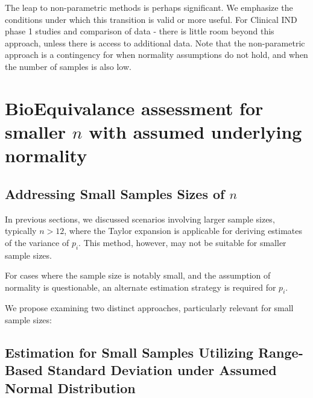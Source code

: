 \documentclass[
  12pt,
  a4paper,
]{article}
\numberwithin{equation}{section}
\theoremstyle{plain}
\theoremstyle{definition}
\theoremstyle{remark}
\theoremstyle{note}
\begin{document}
The leap to non-parametric methods is perhaps significant. We emphasize
the conditions under which this transition is valid or more useful. For
Clinical IND phase 1 studies and comparison of data - there is little
room beyond this approach, unless there is access to additional data.
Note that the non-parametric approach is a contingency for when
normality assumptions do not hold, and when the number of samples is
also low.

\newpage

\hypertarget{bioequivalance-assessment-for-smaller-n-with-assumed-underlying-normality}{%
\section{\texorpdfstring{BioEquivalance assessment for smaller \(n\)
with assumed underlying
normality}{BioEquivalance assessment for smaller n with assumed underlying normality}}\label{bioequivalance-assessment-for-smaller-n-with-assumed-underlying-normality}}

\hypertarget{addressing-small-samples-sizes-of-n}{%
\subsection{\texorpdfstring{Addressing Small Samples Sizes of
\(n\)}{Addressing Small Samples Sizes of n}}\label{addressing-small-samples-sizes-of-n}}

In previous sections, we discussed scenarios involving larger sample
sizes, typically \(n>12\), where the Taylor expansion is applicable for
deriving estimates of the variance of \(p_i\). This method, however, may
not be suitable for smaller sample sizes.

For cases where the sample size is notably small, and the assumption of
normality is questionable, an alternate estimation strategy is required
for \(p_i\).

We propose examining two distinct approaches, particularly relevant for
small sample sizes:

\hypertarget{estimation-for-small-samples-utilizing-range-based-standard-deviation-under-assumed-normal-distribution}{%
\subsection{Estimation for Small Samples Utilizing Range-Based Standard
Deviation under Assumed Normal
Distribution}\label{estimation-for-small-samples-utilizing-range-based-standard-deviation-under-assumed-normal-distribution}}
\end{document}

